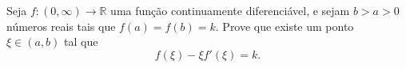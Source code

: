 Seja \(f\colon  (0, \infty) \to \mathbb{R}\) uma função continuamente diferenciável, e sejam \(b > a > 0\) números reais tais que \(f(a) = f(b) = k\). Prove que existe um ponto \(\xi \in (a, b)\) tal que
\[
f(\xi) - \xi f'(\xi) = k.
\]
